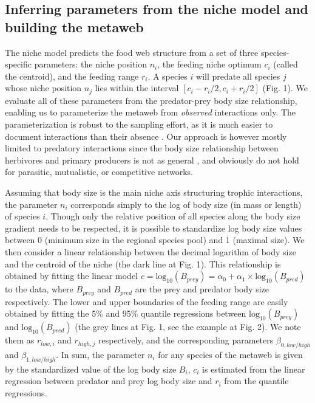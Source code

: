 \documentclass[12pt]{article}
\begin{document}
\subsection{Inferring parameters from the niche model and building the metaweb}
The niche model predicts the food web structure from a set of three species-specific parameters: the niche position $n_i$, the feeding niche optimum $c_i$ (called the centroid), and the feeding range $r_i$. A species $i$ will predate all species $j$ whose niche position $n_j$ lies within the interval $[c_i-r_i/2,c_i+r_i/2]$ (Fig. 1). We evaluate all of these parameters from the predator-prey body size relationship, enabling us to parameterize the metaweb from \emph{observed} interactions only. The parameterization is robust to the sampling effort, as it is much easier to document interactions than their absence \parencite{Martinez1999}. Our approach is however mostly limited to predatory interactions since the body size relationship between herbivores and primary producers is not as general \parencite{Riede2010}, and obviously do not hold for parasitic, mutualistic, or competitive networks. 

Assuming that body size is the main niche axis structuring trophic interactions, the parameter $n_i$ corresponds simply to the log of body size (in mass or length) of species $i$. Though only the relative position of all species along the body size gradient needs to be respected, it is possible to standardize log body size values between 0 (minimum size in the regional species pool) and 1 (maximal size). We then consider a linear relationship between the decimal logarithm of body size and the centroid of the niche (the dark line at Fig. 1). This relationship is obtained by fitting the linear model $c = \mathrm{log}_{10}(B_{prey})=\alpha_0 + \alpha_1\times\mathrm{log}_{10}(B_{pred})$ to the data, where $B_{prey}$ and $B_{pred}$ are the prey and predator body size respectively. The lower and upper boundaries of the feeding range are easily obtained by fitting the 5\% and 95\% quantile regressions between $\mathrm{log}_{10}(B_{prey})$ and $\mathrm{log}_{10}(B_{pred})$ (the grey lines at Fig. 1, see the example at Fig. 2). We note them as $r_{low,i}$ and $r_{high,j}$ respectively, and the corresponding parameters $\beta_{0,low/high}$ and $\beta_{1,low/high}$.  In sum, the parameter $n_i$ for any species of the metaweb is given by the standardized value of the log body size $B_i$, $c_i$ is estimated from the linear regression between predator and prey log body size and $r_i$ from the quantile regressions. 
\end{document}
